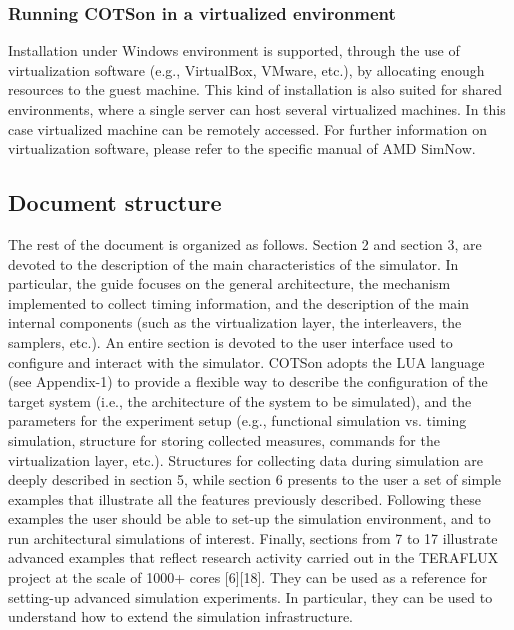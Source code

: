 \documentclass[a4paper]{article}
\begin{document}
\bigskip

\subsubsection[Running COTSon in a virtualized environment]{\rmfamily
Running COTSon in a virtualized environment}
{
Installation under Windows environment is supported, through the use of
virtualization software (e.g., VirtualBox, VMware, etc.), by allocating
enough resources to the guest machine. This kind of installation is
also suited for shared environments, where a single server can host
several virtualized machines. In this case virtualized machine can be
remotely accessed. For further information on virtualization software,
please refer to the specific manual of AMD SimNow.}

\subsection[Document structure]{Document structure}
{
The rest of the document is organized as follows. Section 2 and section
3, are devoted to the description of the main characteristics of the
simulator. In particular, the guide focuses on the general
architecture, the mechanism implemented to collect timing information,
and the description of the main internal components (such as the
virtualization layer, the interleavers, the samplers, etc.). An entire
section is devoted to the user interface used to configure and interact
with the simulator. COTSon adopts the LUA language (see Appendix-1) to
provide a flexible way to describe the configuration of the target
system (i.e., the architecture of the system to be simulated), and the
parameters for the experiment setup (e.g., functional simulation vs.
timing simulation, structure for storing collected measures, commands
for the virtualization layer, etc.). Structures for collecting data
during simulation are deeply described in section 5, while section 6
presents to the user a set of simple examples that illustrate all the
features previously described. Following these examples the user should
be able to set-up the simulation environment, and to run architectural
simulations of interest. Finally, sections from 7 to 17 illustrate
advanced examples that reflect research activity carried out in the
TERAFLUX project at the scale of 1000+ cores [6][18]. They can be used
as a reference for setting-up advanced simulation experiments. In
particular, they can be used to understand how to extend the simulation
infrastructure.}
\end{document}
